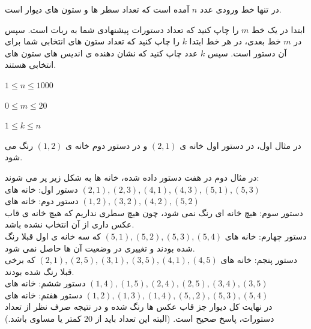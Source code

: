 \documentclass[11.5pt,a4paper,oneside]{article}
\begin{document}
\begin{problem}

در تنها خط ورودی عدد
$n$
آمده است که تعداد سطر ها و ستون های دیوار است.
\outputDescription

ابتدا در یک خط
$m$
را چاپ کنید که تعداد دستورات پیشنهادی شما به ربات است.
سپس در
$m$
خط بعدی، در هر خط ابتدا
$k$
را چاپ کنید که تعداد ستون های انتخابی شما برای آن دستور است.
سپس
$k$
عدد چاپ کنید که نشان دهنده ی اندیس های ستون های انتخابی هستند.

\constraints
\begin{shortitems}
\item $1 \leq n \leq 1000$
\item $0 \leq m \leq 20$
\item $1 \leq k \leq n$
\end{shortitems}

\sampleIO

\begin{example}
%
%
\end{example}

\sampleIODescription
در مثال اول، در دستور اول خانه ی
$(2, 1)$
و در دستور دوم خانه ی
$(1, 2)$
رنگ می شود.

در مثال دوم در هفت دستور داده شده، خانه ها به شکل زیر پر می شوند:
\\
دستور اول: خانه های
$(2, 1), (2, 3), (4, 1), (4, 3), (5, 1), (5, 3)$
\\
دستور دوم: خانه های
$(1, 2), (3, 2), (4, 2), (5, 2)$
\\
دستور سوم: هیچ خانه ای رنگ نمی شود، چون هیچ سطری نداریم که هیچ خانه ی قاب عکس داری از آن انتخاب نشده باشد.
\\
دستور چهارم: خانه های
$(5, 1), (5, 2), (5, 3), (5, 4)$
که سه خانه ی اول قبلا رنگ شده بودند و تغییری در وضعیت آن ها حاصل نمی شود.
\\
دستور پنجم: خانه های
$(2, 1), (2, 5), (3, 1), (3, 5), (4, 1), (4, 5)$
که برخی قبلا رنگ شده بودند.
\\
دستور ششم: خانه های
$(1, 4), (1, 5), (2, 4), (2, 5), (3, 4), (3, 5)$
\\
دستور هفتم: خانه های
$(1, 2), (1, 3), (1, 4), (5, ,2), (5, 3), (5, 4)$
\\
در نهایت کل دیوار جز قاب عکس ها رنگ شده و در نتیجه صرف نظر از تعداد دستورات، پاسخ صحیح است. (البته این تعداد باید از 20 کمتر یا مساوی باشد.)
\end{problem}
\end{document}
